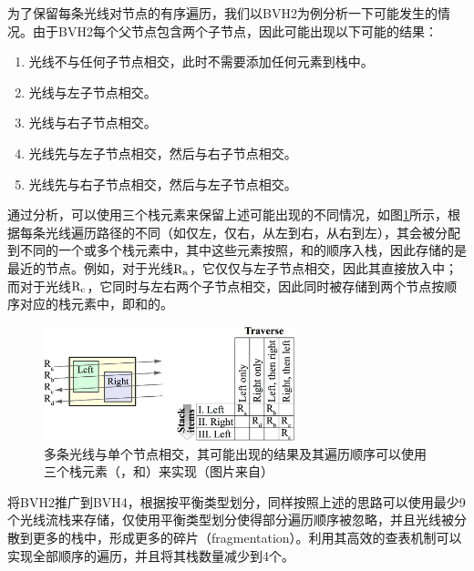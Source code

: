 为了保留每条光线对节点的有序遍历，我们以BVH2为例分析一下可能发生的情况。由于BVH2每个父节点包含两个子节点，因此可能出现以下可能的结果：

\begin{enumerate}
	\item 光线不与任何子节点相交，此时不需要添加任何元素到栈中。
	\item 光线与左子节点相交。
	\item 光线与右子节点相交。
	\item 光线先与左子节点相交，然后与右子节点相交。
	\item 光线先与右子节点相交，然后与左子节点相交。
\end{enumerate}

通过分析，可以使用三个栈元素来保留上述可能出现的不同情况，如图\ref{f:pt-ray-stack-items}所示，根据每条光线遍历路径的不同（如仅左，仅右，从左到右，从右到左），其会被分配到不同的一个或多个栈元素中，其中这些元素按照，和的顺序入栈，因此存储的是最近的节点。例如，对于光线${\rm R_a}$，它仅仅与左子节点相交，因此其直接放入中；而对于光线${\rm R_c}$，它同时与左右两个子节点相交，因此同时被存储到两个节点按顺序对应的栈元素中，即和的。

\begin{figure}
	\sidecaption
	\includegraphics[width=0.65\textwidth]{figures/pt/ray-stack-items}
	\caption{多条光线与单个节点相交，其可能出现的结果及其遍历顺序可以使用三个栈元素（，和）来实现（图片来自\cite{a:DynamicRayStreamTraversal}）}
	\label{f:pt-ray-stack-items}
\end{figure}

将BVH2推广到BVH4，\cite{a:DynamicRayStreamTraversal}根据按平衡类型划分，同样按照上述的思路可以使用最少9个光线流栈来存储，仅使用平衡类型划分使得部分遍历顺序被忽略，并且光线被分散到更多的栈中，形成更多的碎片（fragmentation）。\cite{a:EfficientRayTracingKernelsforModernCPUArchitectures}利用其高效的查表机制可以实现全部顺序的遍历，并且将其栈数量减少到4个。







